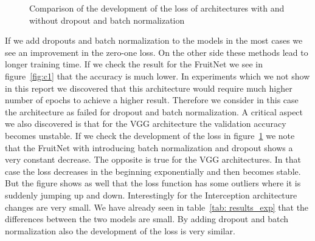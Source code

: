 \documentclass[11pt, a4paper]{article}
\begin{document}
\begin{figure}
\centering
    \hfill
    \hfill
    \hfill
    \hfill
    \caption{Comparison of the development of the loss of architectures with and without dropout and batch normalization}
    \label{fig:loss_full}
\end{figure}

If we add dropouts and batch normalization to the models in the most cases we see an improvement in the zero-one loss. On the other side these methods lead to longer training time. If we check the result for the FruitNet we see in figure~\ref{fig:c1} that the accuracy is much lower. In experiments which we not show in this report we discovered that this architecture would require much higher number of epochs to achieve a higher result. Therefore we consider in this case the architecture as failed for dropout and batch normalization. A critical aspect we also discovered is that for the VGG architecture the validation accuracy becomes unstable. If we check the development of the loss in figure~\ref{fig:loss_full} we note that the FruitNet with introducing batch normalization and dropout shows a very constant decrease. The opposite is true for the VGG architectures. In that case the loss decreases in the beginning exponentially and then becomes stable. But the figure shows as well that the loss function has some outliers where it is suddenly jumping up and down. Interestingly for the Interception architecture changes are very small. We have already seen in table~\ref{tab: results_exp} that the differences between the two models are small. By adding dropout and batch normalization also the development of the loss is very similar.
\end{document}
